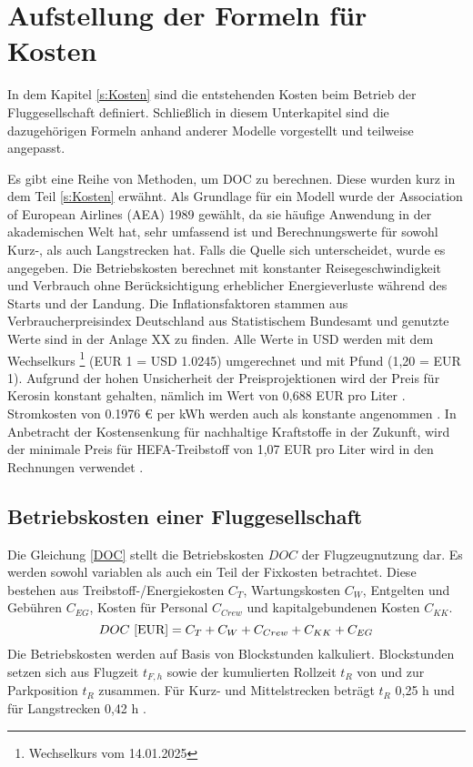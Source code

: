 \section{Aufstellung der Formeln für Kosten}
\label{s:Aufstellung der Formeln für Kosten}

In dem Kapitel \ref{s:Kosten} sind die entstehenden Kosten beim Betrieb der Fluggesellschaft definiert.
Schließlich in diesem Unterkapitel sind die dazugehörigen Formeln anhand anderer Modelle vorgestellt und teilweise angepasst. 

Es gibt eine Reihe von Methoden, um DOC zu berechnen. Diese wurden kurz in dem Teil \ref{s:Kosten} erwähnt.
Als Grundlage für ein Modell wurde der Association of European Airlines (AEA) 1989 gewählt, da sie häufige Anwendung 
in der akademischen Welt hat, sehr umfassend ist und Berechnungswerte für sowohl Kurz-, als auch Langstrecken hat. 
Falls die Quelle sich unterscheidet, wurde es angegeben.
Die Betriebskosten berechnet mit konstanter Reisegeschwindigkeit und Verbrauch ohne Berücksichtigung erheblicher 
Energieverluste während des Starts und der Landung. 
Die Inflationsfaktoren stammen aus Verbraucherpreisindex Deutschland aus Statistischem Bundesamt und genutzte Werte sind in der Anlage XX zu finden.
Alle Werte in USD werden mit dem Wechselkurs \footnote{Wechselkurs vom 14.01.2025} (EUR 1 = USD 1.0245) umgerechnet und mit Pfund (1,20 = EUR 1).
Aufgrund der hohen Unsicherheit der Preisprojektionen wird der Preis für Kerosin konstant gehalten, nämlich im Wert von
0,688 EUR pro Liter \cite{iata_industry_statistics_2024}. Stromkosten von 0.1976 € per kWh werden auch als konstante angenommen \cite{eurostat_nrg_pc_205}.
In Anbetracht der Kostensenkung für nachhaltige Kraftstoffe in der Zukunft, wird der minimale Preis für HEFA-Treibstoff 
von 1,07 EUR pro Liter wird in den Rechnungen verwendet \cite{watson2024sustainable}.
%
%
\subsection{Betriebskosten einer Fluggesellschaft}

Die Gleichung \eqref{DOC} stellt die Betriebskosten $DOC$ der Flugzeugnutzung dar. Es werden sowohl variablen als auch ein 
Teil der Fixkosten betrachtet.
Diese bestehen aus Treibstoff-/Energiekosten $C_T$, 
Wartungskosten $C_W$, Entgelten und Gebühren $C_{EG}$, Kosten für Personal $C_{Crew}$ und kapitalgebundenen Kosten $C_{KK}$.
%
\begin{equation}
     {DOC ~[\text{EUR}]} = C_T + C_W + C_{Crew} + C_{KK} + C_{EG} \\
     \label{DOC}
  \end{equation}
%
Die Betriebskosten werden auf Basis von Blockstunden kalkuliert. 
Blockstunden setzen sich aus Flugzeit $t_{F,h}$ sowie der kumulierten Rollzeit $t_{R}$ von und zur Parkposition $t_{R}$ zusammen. 
Für Kurz- und Mittelstrecken beträgt $t_{R}$ {0,25 h} und für Langstrecken 0,42 h \cite{scholz_design_evaluation_doc}.

